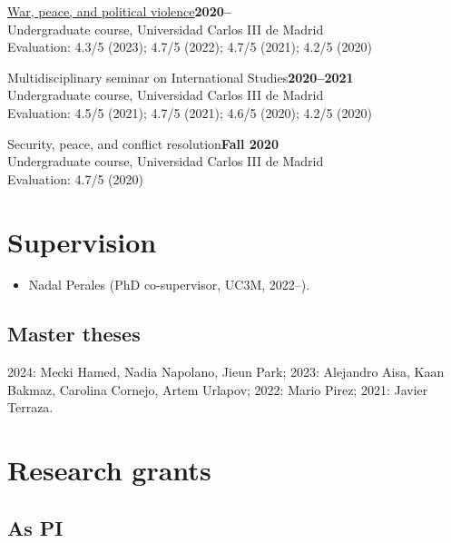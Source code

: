 \documentclass[a4paper, 12pt]{article}
\begin{document}
\noindent
\href{https://github.com/franvillamil/syllabi/blob/master/current/syllabus_war_peace_political_violence.pdf}{War, peace, and political violence}\hfill\textbf{2020--}\\
{\small Undergraduate course, Universidad Carlos III de Madrid}\\
{\small Evaluation: 4.3/5 (2023); 4.7/5 (2022); 4.7/5 (2021); 4.2/5 (2020)}
\vspace{10pt}

\noindent
Multidisciplinary seminar on International Studies\hfill\textbf{2020--2021}\\
{\small Undergraduate course, Universidad Carlos III de Madrid}\\
{\small Evaluation: 4.5/5 (2021); 4.7/5 (2021); 4.6/5 (2020); 4.2/5 (2020)}
\vspace{10pt}

\noindent
Security, peace, and conflict resolution\hfill\textbf{Fall 2020}\\
{\small Undergraduate course, Universidad Carlos III de Madrid}\\
{\small Evaluation: 4.7/5 (2020)}

\section*{Supervision}

\begin{itemize}[leftmargin=*, nolistsep]
	\item Nadal Perales (PhD co-supervisor, UC3M, 2022--).
\end{itemize}

\subsection*{Master theses}

2024: Mecki Hamed, Nadia Napolano, Jieun Park;
2023: Alejandro Aisa, Kaan Bakmaz, Carolina Cornejo, Artem Urlapov;
2022: Mario Pirez;
2021: Javier Terraza.

\section*{Research grants}

\subsection*{As PI}
\end{document}
